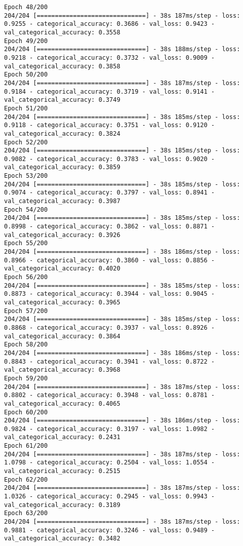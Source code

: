 \begin{lstlisting}
Epoch 48/200
204/204 [==============================] - 38s 187ms/step - loss: 0.9255 - categorical_accuracy: 0.3686 - val_loss: 0.9423 - val_categorical_accuracy: 0.3558
Epoch 49/200
204/204 [==============================] - 38s 188ms/step - loss: 0.9218 - categorical_accuracy: 0.3732 - val_loss: 0.9009 - val_categorical_accuracy: 0.3858
Epoch 50/200
204/204 [==============================] - 38s 187ms/step - loss: 0.9184 - categorical_accuracy: 0.3719 - val_loss: 0.9141 - val_categorical_accuracy: 0.3749
Epoch 51/200
204/204 [==============================] - 38s 185ms/step - loss: 0.9118 - categorical_accuracy: 0.3751 - val_loss: 0.9120 - val_categorical_accuracy: 0.3824
Epoch 52/200
204/204 [==============================] - 38s 185ms/step - loss: 0.9082 - categorical_accuracy: 0.3783 - val_loss: 0.9020 - val_categorical_accuracy: 0.3859
Epoch 53/200
204/204 [==============================] - 38s 185ms/step - loss: 0.9074 - categorical_accuracy: 0.3797 - val_loss: 0.8941 - val_categorical_accuracy: 0.3987
Epoch 54/200
204/204 [==============================] - 38s 185ms/step - loss: 0.8998 - categorical_accuracy: 0.3862 - val_loss: 0.8871 - val_categorical_accuracy: 0.3926
Epoch 55/200
204/204 [==============================] - 38s 186ms/step - loss: 0.8966 - categorical_accuracy: 0.3860 - val_loss: 0.8856 - val_categorical_accuracy: 0.4020
Epoch 56/200
204/204 [==============================] - 38s 185ms/step - loss: 0.8873 - categorical_accuracy: 0.3944 - val_loss: 0.9045 - val_categorical_accuracy: 0.3965
Epoch 57/200
204/204 [==============================] - 38s 185ms/step - loss: 0.8868 - categorical_accuracy: 0.3937 - val_loss: 0.8926 - val_categorical_accuracy: 0.3864
Epoch 58/200
204/204 [==============================] - 38s 186ms/step - loss: 0.8843 - categorical_accuracy: 0.3941 - val_loss: 0.8722 - val_categorical_accuracy: 0.3968
Epoch 59/200
204/204 [==============================] - 38s 187ms/step - loss: 0.8802 - categorical_accuracy: 0.3948 - val_loss: 0.8781 - val_categorical_accuracy: 0.4065
Epoch 60/200
204/204 [==============================] - 38s 186ms/step - loss: 0.9824 - categorical_accuracy: 0.3197 - val_loss: 1.0982 - val_categorical_accuracy: 0.2431
Epoch 61/200
204/204 [==============================] - 38s 187ms/step - loss: 1.0798 - categorical_accuracy: 0.2504 - val_loss: 1.0554 - val_categorical_accuracy: 0.2515
Epoch 62/200
204/204 [==============================] - 38s 187ms/step - loss: 1.0326 - categorical_accuracy: 0.2945 - val_loss: 0.9943 - val_categorical_accuracy: 0.3189
Epoch 63/200
204/204 [==============================] - 38s 187ms/step - loss: 0.9881 - categorical_accuracy: 0.3246 - val_loss: 0.9489 - val_categorical_accuracy: 0.3482

\end{lstlisting}
